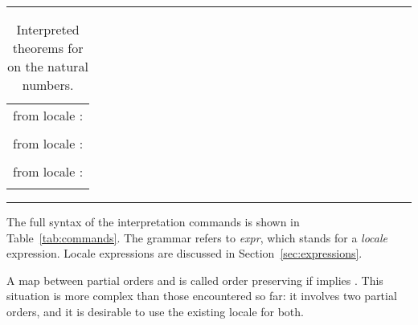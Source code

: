 \begin{isabellebody}
\begin{isamarkuptext}
\begin{table}
\hrule
\vspace{2ex}
\begin{center}
\begin{tabular}{l}
  \isa{nat{\isacharunderscore}dvd{\isachardot}less{\isacharunderscore}def} from locale \isa{partial{\isacharunderscore}order}: \\
  \quad \isa{{\isacharparenleft}{\isacharquery}x\ dvd\ {\isacharquery}y\ {\isasymand}\ {\isacharquery}x\ {\isasymnoteq}\ {\isacharquery}y{\isacharparenright}\ {\isacharequal}\ {\isacharparenleft}{\isacharquery}x\ dvd\ {\isacharquery}y\ {\isasymand}\ {\isacharquery}x\ {\isasymnoteq}\ {\isacharquery}y{\isacharparenright}} \\
  \isa{nat{\isacharunderscore}dvd{\isachardot}meet{\isacharunderscore}left} from locale \isa{lattice}: \\
  \quad \isa{gcd\ {\isacharquery}x\ {\isacharquery}y\ dvd\ {\isacharquery}x} \\
  \isa{nat{\isacharunderscore}dvd{\isachardot}join{\isacharunderscore}distr} from locale \isa{distrib{\isacharunderscore}lattice}: \\
  \quad \isa{lattice{\isachardot}join\ op\ dvd\ {\isacharquery}x\ {\isacharparenleft}lattice{\isachardot}meet\ op\ dvd\ {\isacharquery}y\ {\isacharquery}z{\isacharparenright}\ {\isacharequal}\ lattice{\isachardot}meet\ op\ dvd\ {\isacharparenleft}lattice{\isachardot}join\ op\ dvd\ {\isacharquery}x\ {\isacharquery}y{\isacharparenright}\ {\isacharparenleft}lattice{\isachardot}join\ op\ dvd\ {\isacharquery}x\ {\isacharquery}z{\isacharparenright}} \\
\end{tabular}
\end{center}
\hrule
\caption{Interpreted theorems for  on the natural numbers.}
\label{tab:nat-dvd-lattice}
\end{table}%
\end{isamarkuptext}%
\isamarkuptrue%
%
\begin{isamarkuptext}%
The full syntax of the interpretation commands is shown in
  Table~\ref{tab:commands}.  The grammar refers to
  \textit{expr}, which stands for a \emph{locale} expression.  Locale
  expressions are discussed in Section~\ref{sec:expressions}.%
\end{isamarkuptext}%
\isamarkuptrue%
%
\isamarkuptrue%
%
\begin{isamarkuptext}%
A map \isa{{\isasymphi}} between partial orders \isa{{\isasymsqsubseteq}} and \isa{{\isasympreceq}}
  is called order preserving if  implies .  This situation is more complex than those encountered so
  far: it involves two partial orders, and it is desirable to use the
  existing locale for both.


\end{isamarkuptext}
\end{isabellebody}
